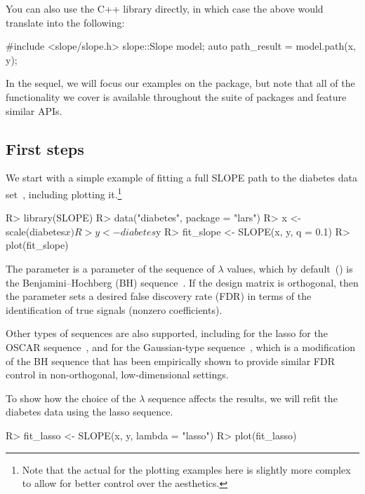 \documentclass[article]{jss}
\begin{document}
\medskip

You can also use the C++ library directly, in
which case the above would translate into the
following:
\begin{Code}
#include <slope/slope.h>
slope::Slope model;
auto path_result = model.path(x, y);
\end{Code}

In the sequel, we will focus our examples on the  package, but
note that all of the functionality we cover is available throughout
the suite of packages and feature similar APIs.

\subsection{First steps}

We start with a simple example of fitting a full SLOPE path to the diabetes
data set~\citep{efron2004}, including plotting it.\footnote{Note that
  the actual for the plotting examples here is slightly more complex
  to allow for better control over the aesthetics.}

\begin{Code}
R> library(SLOPE)
R> data("diabetes", package = "lars")
R> x <- scale(diabetes$x)
R> y <- diabetes$y
R> fit_slope <- SLOPE(x, y, q = 0.1)
R> plot(fit_slope)
\end{Code}

The  parameter is a parameter of the sequence of \(\lambda\) values,
which by default~() is the Benjamini--Hochberg (BH)
sequence~\citep{bogdan2015}. If the design matrix is orthogonal, then the
 parameter sets a desired false discovery rate (FDR) in terms
of the identification of true signals (nonzero coefficients).

Other types of sequences are also supported,
including  for the lasso
 for the OSCAR sequence~\citep{bondell2008}, and
 for the Gaussian-type sequence~\citep{bogdan2015},
which is a modification of the BH sequence that has been empirically shown to
provide similar FDR control in non-orthogonal, low-dimensional settings.

To show how the choice of the \(\lambda\) sequence affects the
results, we will refit the diabetes data using the lasso sequence.

\begin{Code}
R> fit_lasso <- SLOPE(x, y, lambda = "lasso")
R> plot(fit_lasso)
\end{Code}
\end{document}
